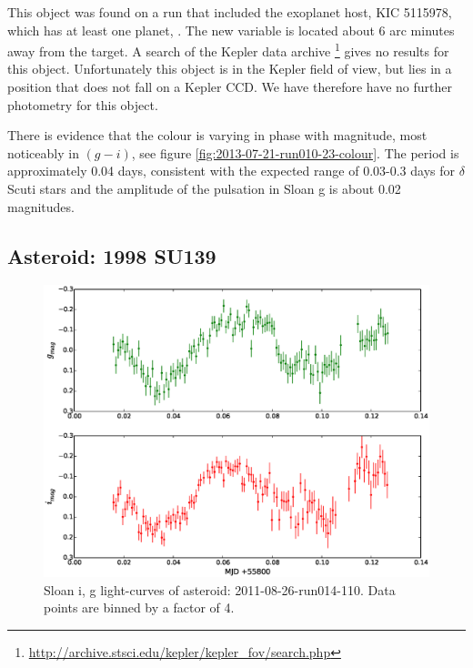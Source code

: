 
This object was found on a run that included the exoplanet host, KIC 5115978, which has at least one planet, \citep{KIC5115978}. The new variable is located about 6 arc minutes away from the target. A search of the Kepler data archive \footnote{\url{http://archive.stsci.edu/kepler/kepler_fov/search.php}} gives no results for this object. Unfortunately this object is in the Kepler field of view, but lies in a position that does not fall on a Kepler CCD. We have therefore have no further photometry for this object. 

There is evidence that the colour is varying in phase with magnitude, most noticeably in $(g - i)$, see figure \ref{fig:2013-07-21-run010-23-colour}. The period is approximately 0.04 days, consistent with the expected range of 0.03-0.3 days for $\delta$ Scuti stars and the amplitude of the pulsation in Sloan g is about 0.02 magnitudes.

\subsection{Asteroid: 1998 SU139}

\begin{figure}
  \center
  \includegraphics[width=140mm]{images/2011-08-26-run014-110-lightcurve-bin4.eps} 
  \caption{Sloan i, g light-curves of asteroid: 2011-08-26-run014-110. Data points are binned by a factor of 4.}
  \label{fig:2011-08-26-run014-110}
\end{figure}


